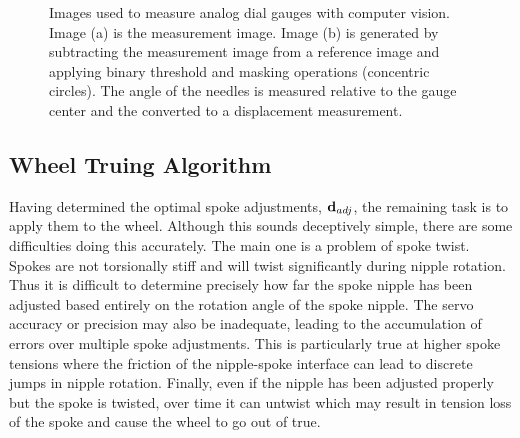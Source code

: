 \documentclass[journal]{IEEEtran}
\begin{document}
\begin{figure}[!t]
    \centering
    \quad
    \caption{Images used to measure analog dial gauges with computer vision. Image (a) is the measurement image.  Image (b) is generated by subtracting the measurement image from a reference image and applying binary threshold and masking operations (concentric circles). The angle of the needles is measured relative to the gauge center and the converted to a displacement measurement.}
    \label{fig:cv_img}
\end{figure}

\subsection{Wheel Truing Algorithm}
Having determined the optimal spoke adjustments, ${\bf d}_{adj}$, the remaining task is to apply them to the wheel. Although this sounds deceptively simple, there are some difficulties doing this accurately.  The main one is a problem of spoke twist. Spokes are not torsionally stiff and will twist significantly during nipple rotation.  Thus it is difficult to determine precisely how far the spoke nipple has been adjusted based entirely on the rotation angle of the spoke nipple. The servo accuracy or precision may also be inadequate, leading to the accumulation of errors over multiple spoke adjustments. This is particularly true at higher spoke tensions where the friction of the nipple-spoke interface can lead to discrete jumps in nipple rotation. Finally, even if the nipple has been adjusted properly but the spoke is twisted, over time it can untwist which may result in tension loss of the spoke and cause the wheel to go out of true. 
\end{document}
